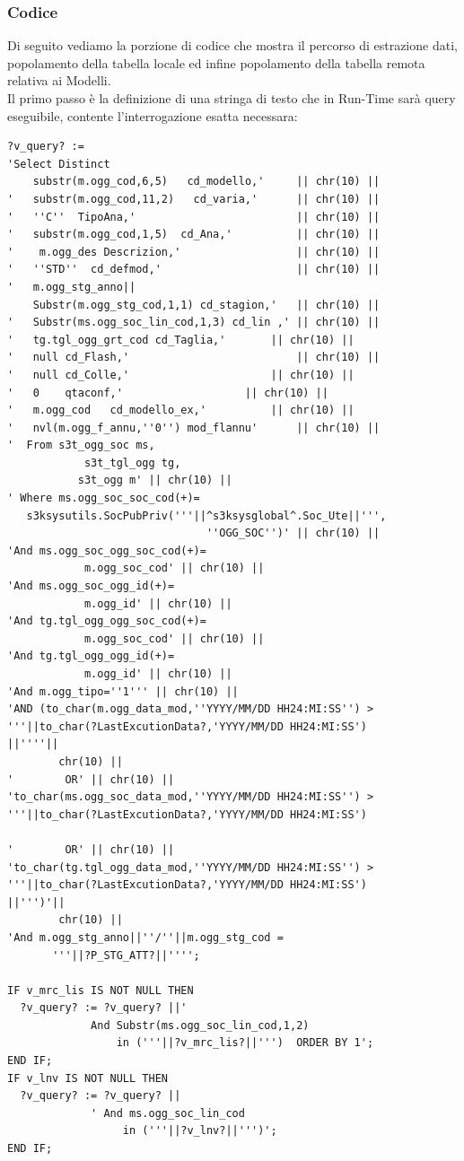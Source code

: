 \subsubsection{Codice}
Di seguito vediamo la porzione di codice che mostra il percorso di estrazione dati, popolamento della tabella locale ed infine popolamento della tabella remota relativa ai Modelli.\\
Il primo passo è la definizione di una stringa di testo che in Run-Time sarà query eseguibile, contente l'interrogazione esatta necessara:
\begin{lstlisting}[frame=single, style=base]
?v_query? := 
'Select Distinct 
    substr(m.ogg_cod,6,5)   cd_modello,'     || chr(10) ||
'   substr(m.ogg_cod,11,2)   cd_varia,'      || chr(10) ||
'   ''C''  TipoAna,'                         || chr(10) ||
'   substr(m.ogg_cod,1,5)  cd_Ana,'          || chr(10) ||
'    m.ogg_des Descrizion,'                  || chr(10) ||
'   ''STD''  cd_defmod,'                     || chr(10) ||
'   m.ogg_stg_anno||
    Substr(m.ogg_stg_cod,1,1) cd_stagion,'   || chr(10) ||
'   Substr(ms.ogg_soc_lin_cod,1,3) cd_lin ,' || chr(10) ||
'   tg.tgl_ogg_grt_cod cd_Taglia,' 	     || chr(10) ||
'   null cd_Flash,' 	                     || chr(10) ||
'   null cd_Colle,' 		             || chr(10) ||
'   0    qtaconf,' 		             || chr(10) ||
'   m.ogg_cod   cd_modello_ex,' 	     || chr(10) ||
'   nvl(m.ogg_f_annu,''0'') mod_flannu'      || chr(10) ||
'  From s3t_ogg_soc ms,
            s3t_tgl_ogg tg, 
           s3t_ogg m' || chr(10) ||
' Where ms.ogg_soc_soc_cod(+)=
   s3ksysutils.SocPubPriv('''||^s3ksysglobal^.Soc_Ute||''',
                               ''OGG_SOC'')' || chr(10) ||
'And ms.ogg_soc_ogg_soc_cod(+)=
            m.ogg_soc_cod' || chr(10) ||
'And ms.ogg_soc_ogg_id(+)=
            m.ogg_id' || chr(10) ||
'And tg.tgl_ogg_ogg_soc_cod(+)=
            m.ogg_soc_cod' || chr(10) ||
'And tg.tgl_ogg_ogg_id(+)=
            m.ogg_id' || chr(10) ||
'And m.ogg_tipo=''1''' || chr(10) ||
'AND (to_char(m.ogg_data_mod,''YYYY/MM/DD HH24:MI:SS'') >
'''||to_char(?LastExcutionData?,'YYYY/MM/DD HH24:MI:SS')
||''''||
        chr(10) ||
'        OR' || chr(10) ||
'to_char(ms.ogg_soc_data_mod,''YYYY/MM/DD HH24:MI:SS'') >
'''||to_char(?LastExcutionData?,'YYYY/MM/DD HH24:MI:SS')

'        OR' || chr(10) ||
'to_char(tg.tgl_ogg_data_mod,''YYYY/MM/DD HH24:MI:SS'') >
'''||to_char(?LastExcutionData?,'YYYY/MM/DD HH24:MI:SS')
||''')'||
        chr(10) ||
'And m.ogg_stg_anno||''/''||m.ogg_stg_cod =
       '''||?P_STG_ATT?||'''';

IF v_mrc_lis IS NOT NULL THEN
  ?v_query? := ?v_query? ||'
             And Substr(ms.ogg_soc_lin_cod,1,2)
                 in ('''||?v_mrc_lis?||''')  ORDER BY 1';
END IF;
IF v_lnv IS NOT NULL THEN
  ?v_query? := ?v_query? ||
             ' And ms.ogg_soc_lin_cod 
                  in ('''||?v_lnv?||''')';  
END IF;
\end{lstlisting}
